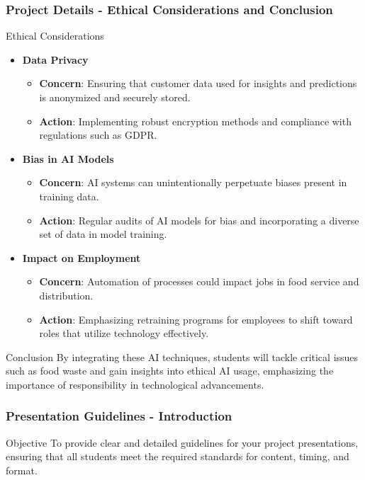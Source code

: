 \documentclass[aspectratio=169]{beamer}
\begin{document}
\begin{frame}[fragile]
    \frametitle{Project Details - Ethical Considerations and Conclusion}
    \begin{block}{Ethical Considerations}
        \begin{itemize}
            \item \textbf{Data Privacy}
                \begin{itemize}
                    \item \textbf{Concern}: Ensuring that customer data used for insights and predictions is anonymized and securely stored.
                    \item \textbf{Action}: Implementing robust encryption methods and compliance with regulations such as GDPR.
                \end{itemize}
            \item \textbf{Bias in AI Models}
                \begin{itemize}
                    \item \textbf{Concern}: AI systems can unintentionally perpetuate biases present in training data.
                    \item \textbf{Action}: Regular audits of AI models for bias and incorporating a diverse set of data in model training.
                \end{itemize}
            \item \textbf{Impact on Employment}
                \begin{itemize}
                    \item \textbf{Concern}: Automation of processes could impact jobs in food service and distribution.
                    \item \textbf{Action}: Emphasizing retraining programs for employees to shift toward roles that utilize technology effectively.
                \end{itemize}
        \end{itemize}
    \end{block}
    
    \begin{block}{Conclusion}
        By integrating these AI techniques, students will tackle critical issues such as food waste and gain insights into ethical AI usage, emphasizing the importance of responsibility in technological advancements.
    \end{block}
\end{frame}

\begin{frame}[fragile]
    \frametitle{Presentation Guidelines - Introduction}
    \begin{block}{Objective}
        To provide clear and detailed guidelines for your project presentations, ensuring that all students meet the required standards for content, timing, and format.
    \end{block}
\end{frame}
\end{document}
